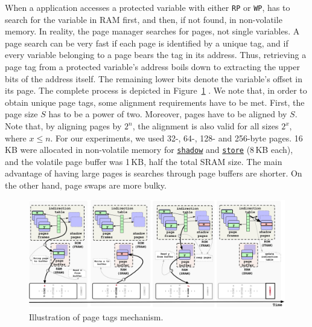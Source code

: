 When a \sys application accesses a protected variable with either \texttt{RP} or \texttt{WP}, \sys has to search for the variable in RAM first, and then, if not found, in non-volatile memory. In reality, the page manager searches for pages, not single variables. A page search can be very fast if each page is identified by a unique tag, and if every variable belonging to a page bears the tag in its address. Thus, retrieving a page tag from a protected variable's address boils down to extracting the upper bits of the address itself. The remaining lower bits denote the variable's offset in its page. The complete process is depicted in Figure~\ref{figure:coala_page_tags} .
We note that, in order to obtain unique page tags, some alignment requirements have to be met. First, the page size $S$ has to be a power of two. Moreover, pages have to be aligned by $S$. Note that, by aligning pages by $2^n$, the alignment is also valid for all sizes $2^x$, where $x \leq n$. For our experiments, we used 32-, 64-, 128- and 256-byte pages. 16\,KB were allocated in non-volatile memory for \texttt{\underline{shadow}} and \texttt{\underline{store}} (8\,KB each), and the volatile page buffer was 1\,KB, half the total SRAM size. The main advantage of having large pages is searches through page buffers are shorter. On the other hand, page swaps are more bulky.

\begin{figure}
	\centering
	\includegraphics[width=\textwidth]{figures/graffle/paging.pdf}
	\caption{Illustration of \sys page tags mechanism.}
	\label{figure:coala_page_tags}
\end{figure}


